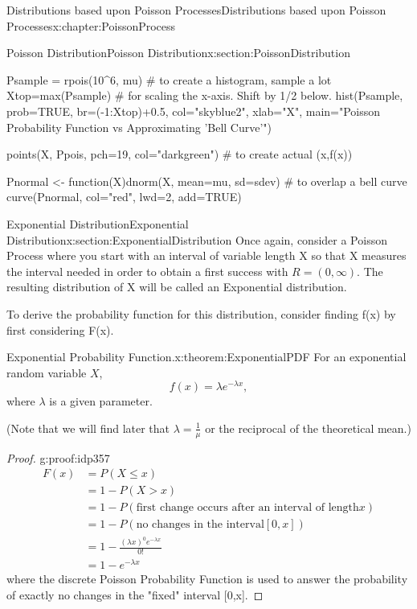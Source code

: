 \documentclass[oneside,10pt,]{book}
\numberwithin{equation}{section}
\newcommand{\gt}{>}
\begin{document}
\begin{chapterptx}{Distributions based upon Poisson Processes}{}{Distributions based upon Poisson Processes}{}{}{x:chapter:PoissonProcess}
\begin{sectionptx}{Poisson Distribution}{}{Poisson Distribution}{}{}{x:section:PoissonDistribution}
\begin{sageinput}
Psample = rpois(10^6, mu)  # to create a histogram, sample a lot
Xtop=max(Psample)          # for scaling the x-axis. Shift by 1/2 below.
hist(Psample, prob=TRUE, br=(-1:Xtop)+0.5, col="skyblue2", xlab="X", 
  main="Poisson Probability Function vs Approximating 'Bell Curve'")

points(X, Ppois, pch=19, col="darkgreen")  # to create actual (x,f(x))

Pnormal <- function(X){dnorm(X, mean=mu, sd=sdev)}   # to overlap a bell curve
curve(Pnormal, col="red", lwd=2, add=TRUE)
\end{sageinput}
%
\end{sectionptx}
%
%
\typeout{************************************************}
\typeout{************************************************}
%
\begin{sectionptx}{Exponential Distribution}{}{Exponential Distribution}{}{}{x:section:ExponentialDistribution}
Once again, consider a Poisson Process where you start with an interval of variable length X so that X measures the interval needed in order to obtain a first success with \(R = (0,\infty)\). The resulting distribution of X will be called an Exponential distribution.%
\par
To derive the probability function for this distribution, consider finding f(x) by first considering F(x).%
\par
\begin{theorem}{Exponential Probability Function.}{}{x:theorem:ExponentialPDF}%
For an exponential random variable \(X\),%
\begin{equation*}
f(x) = \lambda e^{-\lambda x},
\end{equation*}
where \(\lambda\) is a given parameter.%
\par
(Note that we will find later that \(\lambda = \frac{1}{\mu}\) or the reciprocal of the theoretical mean.)%
 \begin{proof}{}{g:proof:idp357}
%
\begin{align*}
F(x)&  = P(X \le x)\\
& = 1 - P(X \gt x)\\
& = 1 - P(\text{first change occurs after an interval of length} x)\\
& = 1 - P(\text{no changes in the interval} [0,x])\\
& = 1 - \frac{(\lambda x)^0 e^{-\lambda x}}{0!}\\
& = 1 - e^{-\lambda x}
\end{align*}
where the discrete Poisson Probability Function is used to answer the probability of exactly no changes in the "fixed" interval [0,x].%

\end{proof}
\end{theorem}
\end{sectionptx}
\end{chapterptx}
\end{document}
